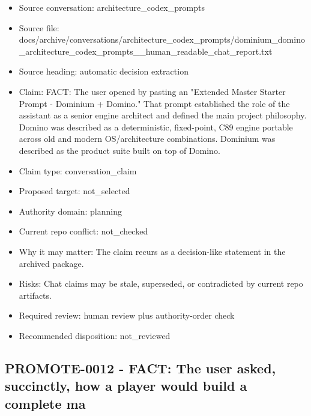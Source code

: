 \documentclass[11pt,a4paper]{report}
\begin{document}
\begin{itemize}
\item Source conversation: architecture\_codex\_prompts
\item Source file: docs/archive/conversations/architecture\_codex\_prompts/dominium\_domino\_architecture\_codex\_prompts\_\_human\_readable\_chat\_report.txt
\item Source heading: automatic decision extraction
\item Claim: FACT: The user opened by pasting an "Extended Master Starter Prompt - Dominium + Domino." That prompt established the role of the assistant as a senior engine architect and defined the main project philosophy. Domino was described as a deterministic, fixed-point, C89 engine portable across old and modern OS/architecture combinations. Dominium was described as the product suite built on top of Domino.
\item Claim type: conversation\_claim
\item Proposed target: not\_selected
\item Authority domain: planning
\item Current repo conflict: not\_checked
\item Why it may matter: The claim recurs as a decision-like statement in the archived package.
\item Risks: Chat claims may be stale, superseded, or contradicted by current repo artifacts.
\item Required review: human review plus authority-order check
\item Recommended disposition: not\_reviewed
\end{itemize}

\subsection{PROMOTE-0012 - FACT: The user asked, succinctly, how a player would build a complete ma}
\end{document}
